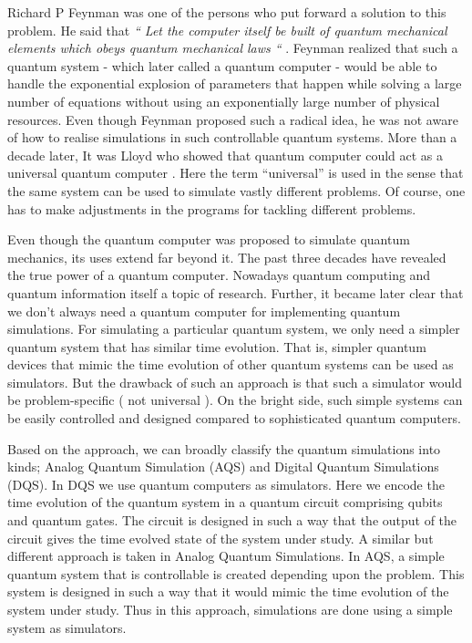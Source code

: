 Richard P Feynman was one of the persons who put forward a solution to this problem. He said that \emph{“ Let the computer itself be built of quantum mechanical elements which obeys quantum mechanical laws “} \cite{feynman82}. Feynman realized that such a quantum system - which later called a quantum computer - would be able to handle the exponential explosion of parameters that happen while solving a large number of equations without using an exponentially large number of physical resources. Even though Feynman proposed such a radical idea, he was not aware of how to realise simulations in such controllable quantum systems. More than a decade later, It was Lloyd who showed that quantum computer could act as a universal quantum computer \cite{lloyd}. Here the term “universal” is used in the sense that the same system can be used to simulate vastly different problems. Of course, one has to make adjustments in the programs for tackling different problems. 

Even though the quantum computer was proposed to simulate quantum mechanics, its uses extend far beyond it. The past three decades have revealed the true power of a quantum computer. Nowadays quantum computing and quantum information itself a topic of research. Further, it became later clear that we don’t always need a quantum computer for implementing quantum simulations. For simulating a particular quantum system, we only need a simpler quantum system that has similar time evolution. That is, simpler quantum devices that mimic the time evolution of other quantum systems can be used as simulators. But the drawback of such an approach is that such a simulator would be problem-specific ( not universal ). On the bright side, such simple systems can be easily controlled and designed compared to sophisticated quantum computers.

Based on the approach, we can broadly classify the quantum simulations into kinds; Analog Quantum Simulation (AQS) and Digital Quantum Simulations (DQS). In DQS we use quantum computers as simulators. Here we encode the time evolution of the quantum system in a quantum circuit comprising qubits and quantum gates.  The circuit is designed in such a way that the output of the circuit gives the time evolved state of the system under study.  A similar but different approach is taken in Analog Quantum Simulations. In AQS, a simple quantum system that is controllable is created depending upon the problem. This system is designed in such a way that it would mimic the time evolution of the system under study. Thus in this approach, simulations are done using a simple system as simulators.

